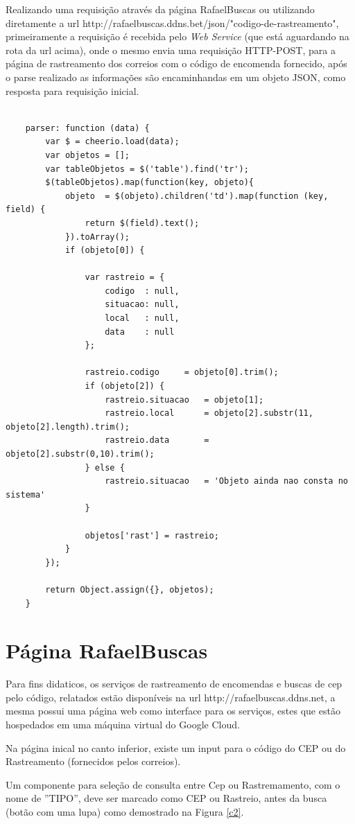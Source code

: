 \documentclass[12pt]{article}
\begin{document}
	Realizando uma requisição através da página RafaelBuscas ou utilizando diretamente a url http://rafaelbuscas.ddns.bet/json/"codigo-de-rastreamento", primeiramente a requisição é recebida pelo \textit{Web Service} (que está aguardando na rota da url acima), onde o mesmo envia uma requisição HTTP-POST, para a página de rastreamento dos correios com o código de encomenda fornecido, após o parse realizado as informações são encaminhandas em um objeto JSON, como resposta para requisição inicial.   
	\medskip
	\begin{lstlisting}[caption=Criando um Crawling para parsar as tags,label=c4]
	
	parser: function (data) {
		var $ = cheerio.load(data);
		var objetos = [];
		var tableObjetos = $('table').find('tr');
		$(tableObjetos).map(function(key, objeto){
			objeto  = $(objeto).children('td').map(function (key, field) {
				return $(field).text();
			}).toArray();
			if (objeto[0]) {
				
				var rastreio = {
					codigo  : null,
					situacao: null,
					local   : null,
					data    : null
				};
				
				rastreio.codigo     = objeto[0].trim();
				if (objeto[2]) {
					rastreio.situacao   = objeto[1];
					rastreio.local      = objeto[2].substr(11, objeto[2].length).trim();
					rastreio.data       = objeto[2].substr(0,10).trim();
				} else {
					rastreio.situacao   = 'Objeto ainda nao consta no sistema'
				}
				
				objetos['rast'] = rastreio;
			}
		});
		
		return Object.assign({}, objetos);
	}
	  	\end{lstlisting}
	  	
	  	
	  	\section{Página RafaelBuscas}
	  	Para fins didaticos, os serviços de rastreamento de encomendas e buscas de cep pelo código, relatados estão disponíveis na url http://rafaelbuscas.ddns.net, a mesma possui uma página web como interface para os serviços, estes que estão hospedados em uma máquina virtual do Google Cloud.
	  	
	  	Na página inical no canto inferior, existe um input para o código do CEP ou do Rastreamento (fornecidos pelos correios).
	  	
	  	Um componente para seleção de consulta entre Cep ou Rastremamento, com o nome de ''TIPO'', deve ser marcado como CEP ou Rastreio, antes da busca (botão com uma lupa) como demostrado na Figura \ref{c2}.
	  	
\end{document}
